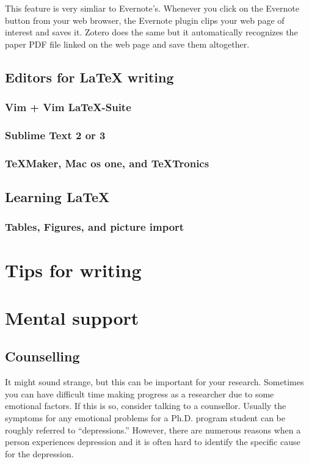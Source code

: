 \documentclass[11pt]{article}
\begin{document}
This feature is very simliar to Evernote's. Whenever you click on the Evernote
button from your web browser, the Evernote plugin clips your web page of
interest and saves it. Zotero does the same but it automatically recognizes
the paper PDF file linked on the web page and save them altogether.

\subsection{Editors for LaTeX writing}

\subsubsection{Vim + Vim LaTeX-Suite}

\subsubsection{Sublime Text 2 or 3}

\subsubsection{TeXMaker, Mac os one, and TeXTronics}


\subsection{Learning LaTeX}

\subsubsection{Tables, Figures, and picture import}


\section{Tips for writing}



\section{Mental support}

\subsection{Counselling}
It might sound strange, but this can be important for your research.
Sometimes you can have difficult time making progress as a researcher due to
some emotional factors. If this is so, consider talking to a counsellor.
Usually the symptoms for any emotional problems for a Ph.D.  program student
can be roughly referred to ``depressions.'' However, there are numerous
reasons when a person experiences depression and it is often hard to identify
the specific cause for the depression.
\end{document}
